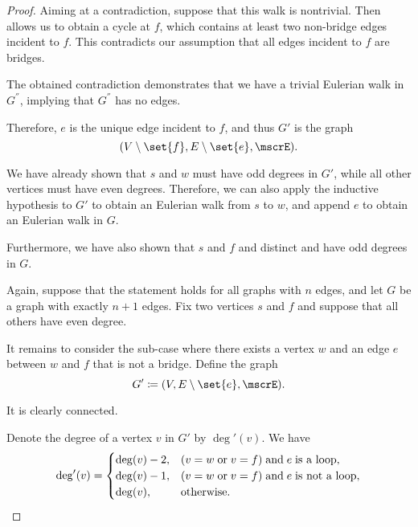 \begin{proof}
  Aiming at a contradiction, suppose that this walk is nontrivial. Then  allows us to obtain a cycle at \( f \), which contains at least two non-bridge edges incident to \( f \). This contradicts our assumption that all edges incident to \( f \) are bridges.

  The obtained contradiction demonstrates that we have a trivial Eulerian walk in \( G^\dprime \), implying that \( G^\dprime \) has no edges.

  Therefore, \( e \) is the unique edge incident to \( f \), and thus \( G' \) is the graph
  \begin{equation*}
    (V \setminus \set{ f }, E \setminus \set{ e }, \mscrE).
  \end{equation*}

  We have already shown that \( s \) and \( w \) must have odd degrees in \( G' \), while all other vertices must have even degrees. Therefore, we can also apply the inductive hypothesis to \( G' \) to obtain an Eulerian walk from \( s \) to \( w \), and append \( e \) to obtain an Eulerian walk in \( G \).

  Furthermore, we have also shown that \( s \) and \( f \) and distinct and have odd degrees in \( G \).

   Again, suppose that the statement holds for all graphs with \( n \) edges, and let \( G \) be a graph with exactly \( n + 1 \) edges. Fix two vertices \( s \) and \( f \) and suppose that all others have even degree.

  It remains to consider the sub-case where there exists a vertex \( w \) and an edge \( e \) between \( w \) and \( f \) that is not a bridge. Define the graph
  \begin{equation*}
    G' \coloneqq (V, E \setminus \set{ e }, \mscrE).
  \end{equation*}

  It is clearly connected.

  Denote the degree of a vertex \( v \) in \( G' \) by \( \deg'(v) \). We have
  \begin{equation}\label{eq:thm:eulers_theorem_for_graphs/proof/necessity/deg}
    \deg'(v) = \begin{cases}
      \deg(v) - 2, &(v = w \T{or} v = f) \T{and} e \T{is a loop}, \\
      \deg(v) - 1, &(v = w \T{or} v = f) \T{and} e \T{is not a loop}, \\
      \deg(v),     &\T{otherwise.}
    \end{cases}
  \end{equation}


\end{proof}
